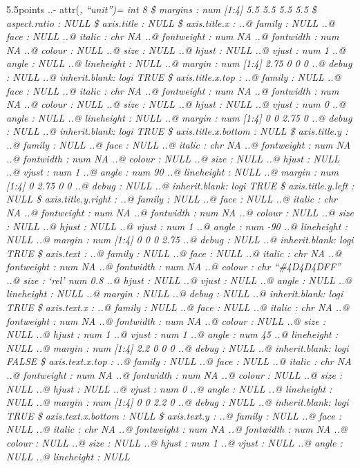\documentclass[
]{article}
\begin{document}
5.5points ..- attr(\emph{, ``unit'')= int 8 \$ margins : num {[}1:4{]}
5.5 5.5 5.5 5.5 \$ aspect.ratio : NULL \$ axis.title : NULL \$
axis.title.x : ..@ family : NULL ..@ face : NULL ..@ italic : chr NA ..@
fontweight : num NA ..@ fontwidth : num NA ..@ colour : NULL ..@ size :
NULL ..@ hjust : NULL ..@ vjust : num 1 ..@ angle : NULL ..@ lineheight
: NULL ..@ margin : num {[}1:4{]} 2.75 0 0 0 ..@ debug : NULL ..@
inherit.blank: logi TRUE \$ axis.title.x.top : ..@ family : NULL ..@
face : NULL ..@ italic : chr NA ..@ fontweight : num NA ..@ fontwidth :
num NA ..@ colour : NULL ..@ size : NULL ..@ hjust : NULL ..@ vjust :
num 0 ..@ angle : NULL ..@ lineheight : NULL ..@ margin : num {[}1:4{]}
0 0 2.75 0 ..@ debug : NULL ..@ inherit.blank: logi TRUE \$
axis.title.x.bottom : NULL \$ axis.title.y : ..@ family : NULL ..@ face
: NULL ..@ italic : chr NA ..@ fontweight : num NA ..@ fontwidth : num
NA ..@ colour : NULL ..@ size : NULL ..@ hjust : NULL ..@ vjust : num 1
..@ angle : num 90 ..@ lineheight : NULL ..@ margin : num {[}1:4{]} 0
2.75 0 0 ..@ debug : NULL ..@ inherit.blank: logi TRUE \$
axis.title.y.left : NULL \$ axis.title.y.right : ..@ family : NULL ..@
face : NULL ..@ italic : chr NA ..@ fontweight : num NA ..@ fontwidth :
num NA ..@ colour : NULL ..@ size : NULL ..@ hjust : NULL ..@ vjust :
num 1 ..@ angle : num -90 ..@ lineheight : NULL ..@ margin : num
{[}1:4{]} 0 0 0 2.75 ..@ debug : NULL ..@ inherit.blank: logi TRUE \$
axis.text : ..@ family : NULL ..@ face : NULL ..@ italic : chr NA ..@
fontweight : num NA ..@ fontwidth : num NA ..@ colour : chr
``\#4D4D4DFF'' ..@ size : `rel' num 0.8 ..@ hjust : NULL ..@ vjust :
NULL ..@ angle : NULL ..@ lineheight : NULL ..@ margin : NULL ..@ debug
: NULL ..@ inherit.blank: logi TRUE \$ axis.text.x : ..@ family : NULL
..@ face : NULL ..@ italic : chr NA ..@ fontweight : num NA ..@
fontwidth : num NA ..@ colour : NULL ..@ size : NULL ..@ hjust : num 1
..@ vjust : num 1 ..@ angle : num 45 ..@ lineheight : NULL ..@ margin :
num {[}1:4{]} 2.2 0 0 0 ..@ debug : NULL ..@ inherit.blank: logi FALSE
\$ axis.text.x.top : ..@ family : NULL ..@ face : NULL ..@ italic : chr
NA ..@ fontweight : num NA ..@ fontwidth : num NA ..@ colour : NULL ..@
size : NULL ..@ hjust : NULL ..@ vjust : num 0 ..@ angle : NULL ..@
lineheight : NULL ..@ margin : num {[}1:4{]} 0 0 2.2 0 ..@ debug : NULL
..@ inherit.blank: logi TRUE \$ axis.text.x.bottom : NULL \$ axis.text.y
: ..@ family : NULL ..@ face : NULL ..@ italic : chr NA ..@ fontweight :
num NA ..@ fontwidth : num NA ..@ colour : NULL ..@ size : NULL ..@
hjust : num 1 ..@ vjust : NULL ..@ angle : NULL ..@ lineheight : NULL
}
\end{document}
